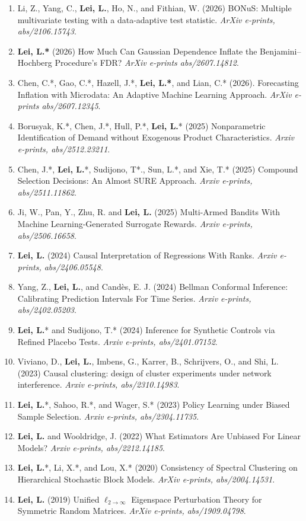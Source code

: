 \documentclass{article}
\begin{document}
\begin{enumerate}
\item Li, Z., Yang, C., \textbf{Lei, L.}, Ho, N., and Fithian, W. (2026) BONuS: Multiple multivariate testing with a data-adaptive test statistic. \emph{ArXiv e-prints, abs/2106.15743}.  
\item \textbf{Lei, L.*} (2026) How Much Can Gaussian Dependence Inflate the Benjamini–Hochberg Procedure’s FDR? \emph{ArXiv e-prints abs/2607.14812}.
\item Chen, C.*, Gao, C.*, Hazell, J.*, \textbf{Lei, L.*}, and Lian, C.* (2026). Forecasting Inflation with Microdata: An Adaptive Machine Learning Approach. \emph{ArXiv e-prints abs/2607.12345}.
\item Borusyak, K.*, Chen, J.*, Hull, P.*, \textbf{Lei, L.}* (2025) Nonparametric Identification of Demand without Exogenous Product Characteristics. \emph{Arxiv e-prints, abs/2512.23211}.
\item Chen, J.*, \textbf{Lei, L.}*, Sudijono, T*., Sun, L.*, and Xie, T.* (2025) Compound Selection Decisions: An Almost SURE Approach. \emph{Arxiv e-prints, abs/2511.11862}.
\item Ji, W., Pan, Y., Zhu, R. and \textbf{Lei, L.} (2025) Multi-Armed Bandits With Machine Learning-Generated Surrogate Rewards. \emph{Arxiv e-prints, abs/2506.16658}.
\item \textbf{Lei, L.} (2024) Causal Interpretation of Regressions With Ranks. \emph{Arxiv e-prints, abs/2406.05548}.
\item Yang, Z., \textbf{Lei, L.}, and Cand\`{e}s, E. J. (2024) Bellman Conformal Inference: Calibrating Prediction Intervals For Time Series. \emph{Arxiv e-prints, abs/2402.05203}.
\item \textbf{Lei, L.}* and Sudijono, T.* (2024) Inference for Synthetic Controls via Refined Placebo Tests. \emph{Arxiv e-prints, abs/2401.07152}.
\item Viviano, D., \textbf{Lei, L.}, Imbens, G., Karrer, B., Schrijvers, O., and Shi, L. (2023) Causal clustering: design of cluster experiments under network interference. \emph{Arxiv e-prints, abs/2310.14983}.
\item \textbf{Lei, L.}*, Sahoo, R.*, and Wager, S.* (2023) Policy Learning under Biased Sample Selection. \emph{Arxiv e-prints, abs/2304.11735}.  
\item \textbf{Lei, L.} and Wooldridge, J. (2022) What Estimators Are Unbiased For Linear Models? \emph{Arxiv e-prints, abs/2212.14185}.
\item \textbf{Lei, L.}*, Li, X.*, and Lou, X.* (2020) Consistency of Spectral Clustering on Hierarchical Stochastic Block Models. \emph{ArXiv e-prints, abs/2004.14531}.
\item \textbf{Lei, L.} (2019) Unified $\ell_{2\rightarrow\infty}$ Eigenspace Perturbation Theory for Symmetric Random Matrices. \emph{ArXiv e-prints, abs/1909.04798}.
\end{enumerate}
\end{document}
